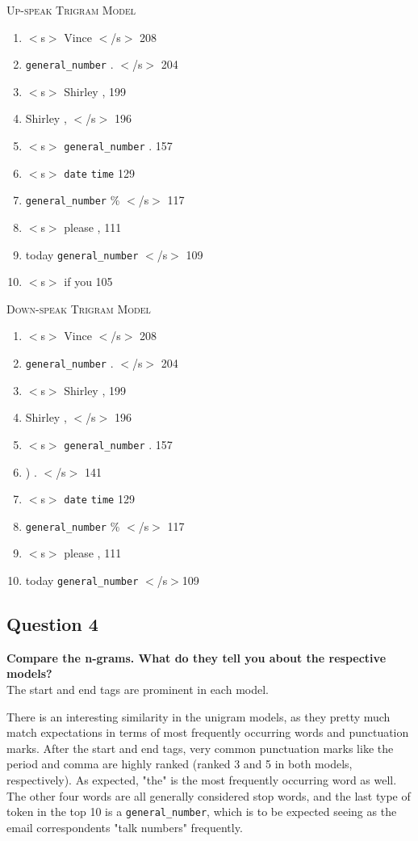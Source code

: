 \documentclass{article} %
\begin{document}
\textsc{Up-speak Trigram Model}\\
\begin{enumerate}
\item $<$s$>$  Vince $<$/s$>$ 208
\item \texttt{general\_number} . $<$/s$>$ 204
\item $<$s$>$  Shirley , 199
\item Shirley , $<$/s$>$ 196
\item $<$s$>$  \texttt{general\_number} . 157
\item $<$s$>$  \texttt{date} \texttt{time} 129
\item \texttt{general\_number} \% $<$/s$>$ 117
\item $<$s$>$  please , 111
\item today \texttt{general\_number} $<$/s$>$ 109
\item $<$s$>$  if you 105
\end{enumerate}

\textsc{Down-speak Trigram Model}\\
\begin{enumerate}
\item $<$s$>$  Vince $<$/s$>$ 208
\item \texttt{general\_number} . $<$/s$>$ 204
\item $<$s$>$  Shirley , 199
\item Shirley , $<$/s$>$ 196
\item $<$s$>$  \texttt{general\_number} . 157
\item ) . $<$/s$>$ 141
\item $<$s$>$  \texttt{date} \texttt{time} 129
\item \texttt{general\_number} \% $<$/s$>$ 117
\item $<$s$>$  please , 111
\item today \texttt{general\_number} $<$/s$>$109
\end{enumerate}


\subsection*{Question 4}

\textbf{Compare the n-grams. What do they tell you about the respective
models?}
\\

The start and end tags are prominent in each model.

There is an interesting similarity in the unigram models, as they pretty much match expectations in terms of most frequently occurring words and punctuation marks. After the start and end tags, very common punctuation marks like the period and comma are highly ranked (ranked 3 and 5 in both models, respectively). As expected, "the" is the most frequently occurring word as well. The other four words are all generally considered stop words, and the last type of  token in the top 10 is a \texttt{general\_number}, which is to be expected seeing as the email correspondents "talk numbers" frequently.\\
\end{document}
